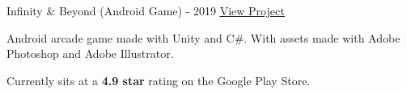 \begin{cventries}
  \cventry
    {} %
    {Infinity \& Beyond (Android Game) - 2019} %
    {\href{https://play.google.com/store/apps/details?id=com.KKSGames.InifintyandBeyond}{\underline{View Project}}} %
    {} %
    {
      \begin{cvitems} %
        \item {Android arcade game made with Unity and C\#. With assets made with Adobe Photoshop and Adobe Illustrator.}
        \item {Currently sits at a \textbf{4.9 star} rating on the Google Play Store.}
      \end{cvitems}
    }


\end{cventries}
